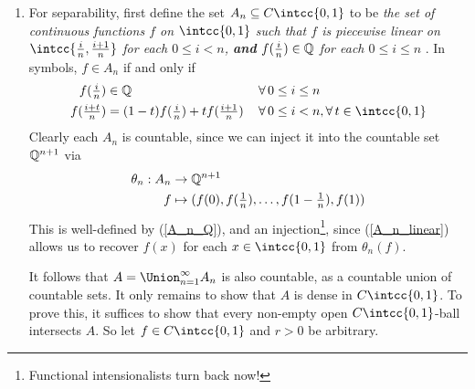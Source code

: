 \documentclass[a4paper,12pt,fleqn]{article}
\begin{document}
\begin{enumerate}[label=\arabic*.,leftmargin=*]
 \item
  For separability, first define the set \(A_n \subset C\intcc{0, 1}\) to be
  \emph{ the set of continuous functions \(f\) on \(\intcc{0, 1}\) such that
  \(f\) is piecewise linear on \(\intcc{\tfrac in, \tfrac {i + 1}n}\) for each
   \(0 \le i < n\), \textbf{and} \(f(\tfrac in) \in \mathbb Q\) for each
   \(0 \le i \le n\)
  }.
  In symbols, \(f \in A_n\) if and only if
  \begin{align}
   f(\tfrac in) &\in \Q && \Forall 0 \le i \le n \label{A_n_Q} \\
   f(\tfrac{i + t}n) &= (1 - t)f(\tfrac in) + tf(\tfrac{i + 1}n)
    && \Forall 0 \le i < n, \Forall t \in \intcc{0, 1} \label{A_n_linear}
  \end{align}
  Clearly each \(A_n\) is countable, since we can inject it into the countable
  set \(\mathbb Q^{n + 1}\) via
  \begin{align*}
   \theta_n: A_n &\to \mathbb Q^{n + 1} \\
   f &\mapsto (f(0), f(\tfrac 1n), \dotsc, f(1 - \tfrac 1n), f(1))
  \end{align*}
  This is well-defined by (\ref{A_n_Q}), and an injection\footnote{%
   Functional intensionalists turn back now!
  }, since (\ref{A_n_linear}) allows us to recover \(f(x)\) for each
  \(x \in \intcc{0, 1}\) from \(\theta_n(f)\).

  It follows that \(A = \Union_{n = 1}^\infty A_n\) is also countable, as a
  countable union of countable sets. It only remains to show that \(A\) is dense
  in \(C\intcc{0, 1}\). To prove this, it suffices to show that every non-empty
  open \(C\intcc{0, 1}\)-ball intersects \(A\). So let \(f \in C\intcc{0, 1}\)
  and \(r > 0\) be arbitrary.


\end{enumerate}
\end{document}
